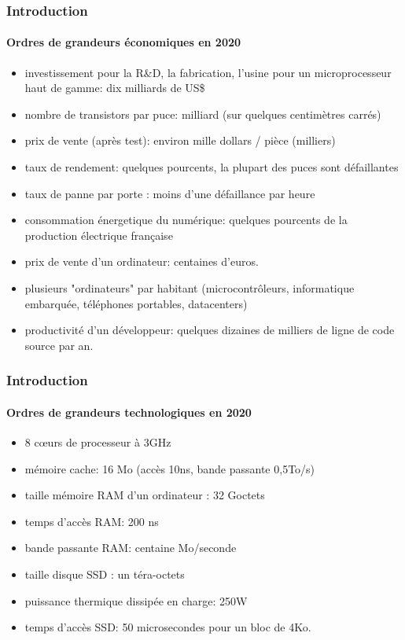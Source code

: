 \documentclass[xcolor=svgnames,final,smaller,a4]{beamer}
\begin{document}
\begin{frame}
  \frametitle{Introduction}
  \framesubtitle{Ordres de grandeurs économiques en 2020}

\begin{itemize}
\item investissement pour la R\&D, la fabrication, l'usine pour un microprocesseur haut de gamme: dix milliards de US\$
\item nombre de transistors par puce: milliard (sur quelques centimètres carrés)
\item prix de vente (après test): environ mille dollars / pièce (milliers)
\item taux de rendement: quelques pourcents, la plupart des puces sont défaillantes
\item taux de panne par porte : moins d'une défaillance par heure
\item consommation énergetique du numérique: quelques pourcents de la production électrique française
\item prix de vente d'un ordinateur: centaines d'euros.
\item plusieurs "ordinateurs" par habitant (microcontrôleurs, informatique embarquée, téléphones portables, datacenters)
  \item productivité d'un développeur: quelques dizaines de milliers de ligne de code source par an.
\end{itemize}
\end{frame}

\begin{frame}
  \frametitle{Introduction}
  \framesubtitle{Ordres de grandeurs technologiques en 2020}
 
\begin{itemize}
\item 8 c{\oe}urs de processeur à 3GHz
\item mémoire cache: 16 Mo (accès 10ns, bande passante 0,5To/s)
\item taille mémoire RAM d'un ordinateur : 32 Goctets
\item temps d'accès RAM: 200 ns
\item bande passante RAM: centaine Mo/seconde
\item taille disque SSD : un téra-octets
\item puissance thermique dissipée en charge: 250W
\item temps d'accès SSD: 50 microsecondes pour un bloc de 4Ko.
\end{itemize}

\end{frame}
\end{document}
